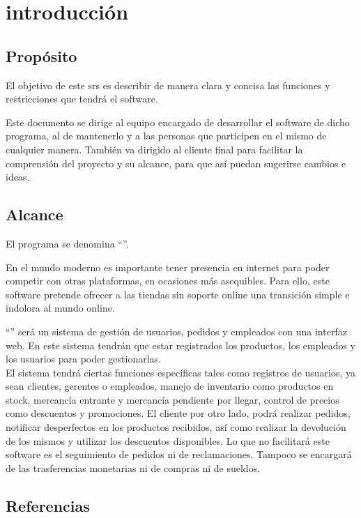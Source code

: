 \section{introducción}
\subsection{Propósito}
El objetivo de este \gls{srs} es describir de manera clara y concisa las funciones y restricciones que tendrá el software.

Este documento se dirige al equipo encargado de desarrollar el software de dicho programa, al de mantenerlo y a las personas que participen en el mismo de cualquier manera. También va dirigido al cliente final para facilitar la comprensión del proyecto y su alcance, para que así puedan sugerirse cambios e ideas.
\subsection{Alcance}
El programa se denomina ``\nombredelproyecto''.

En el mundo moderno es importante tener presencia en internet para poder competir con otras plataformas, en ocasiones más asequibles. Para ello, este software pretende ofrecer a las tiendas sin soporte online una transición simple e indolora al mundo online.

``\nombredelproyecto'' será un sistema de gestión de usuarios, pedidos y empleados con una interfaz web. En este sistema tendrán que estar registrados los productos, los empleados y los usuarios para poder gestionarlas.\\
El sistema tendrá ciertas funciones específicas tales como registros de usuarios, ya sean clientes, gerentes o empleados, manejo de inventario como productos en stock, mercancía entrante y mercancía pendiente por llegar, control de precios como descuentos y promociones. El cliente por otro lado, podrá realizar pedidos, notificar desperfectos en los productos recibidos, así como realizar la devolución de los mismos y utilizar los descuentos disponibles.
Lo que no facilitará este software es el seguimiento de pedidos ni de reclamaciones. Tampoco se encargará de las trasferencias monetarias ni de compras ni de sueldos.

\glsaddall
\nocite{*}
{
    \printglossary[title=Definiciones\, acrónimos y abreviaturas, numberedsection]}


\subsection{Referencias}
\printbibliography[heading=none]

